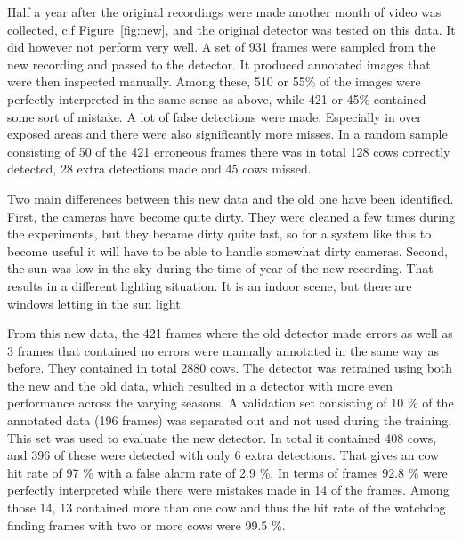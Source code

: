 \documentclass{cta-author}
\begin{document}
Half a year after the original recordings were made another month of video was collected, c.f 
Figure~\ref{fig:new}, and the original detector was tested on this data. It did however not perform very 
well. A set of 931 frames were sampled from the new recording and passed to the detector. It produced 
annotated images that were then inspected manually. Among these, 510 or 55\% of the images were perfectly 
interpreted in the same sense as above, while 421 or 45\% contained some sort of mistake.
A lot of false detections were made. Especially in over exposed areas and there were also significantly 
more misses. In a random sample consisting of 50 of the 421 erroneous frames there was in total 128 cows correctly detected, 28 extra detections made and 45 cows missed.  

Two main differences between this new data and the old one have been identified. 
First, the cameras have become quite dirty. They were cleaned a few times during the experiments, but they 
became dirty quite fast, so for a system like this to become useful it will have to be able to handle 
somewhat dirty cameras. Second, the sun was low in the sky during  the time of year of the new recording. 
That results in a different lighting situation. It is an indoor scene, but there are windows letting in the 
sun light.

From this new data, the 421 frames where the old detector made errors as well as 3 frames that contained no 
errors were manually annotated in the same way as before. They contained in total 2880 cows. The detector was 
retrained using both the new and the old data, which resulted in a detector with more even performance across 
the varying seasons. A validation set consisting of 10 \% of the annotated data (196 frames) was separated 
out and not used during the training. This set was used to evaluate the new detector. In total it contained 
408 cows, and 396 of these were detected with only 6 extra detections. That gives an cow hit rate of 97 \% 
with a false alarm rate of 2.9 \%. In terms of frames 92.8 \% were perfectly interpreted while there were 
mistakes made in 14 of the frames. Among those 14, 13 contained more than one cow and thus the hit rate of 
the watchdog finding frames with two or more cows were 99.5 \%.
\end{document}
